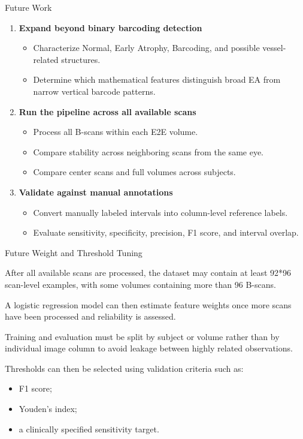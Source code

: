 \documentclass[aspectratio=169]{beamer}
\begin{document}
\begin{frame}{Future Work}

\begin{enumerate}
    \item \textbf{Expand beyond binary barcoding detection}
    \begin{itemize}
        \item Characterize Normal, Early Atrophy, Barcoding, and possible
        vessel-related structures.
        \item Determine which mathematical features distinguish broad EA from
        narrow vertical barcode patterns.
    \end{itemize}

    \item \textbf{Run the pipeline across all available scans}
    \begin{itemize}
        \item Process all B-scans within each E2E volume.
        \item Compare stability across neighboring scans from the same eye.
        \item Compare center scans and full volumes across subjects.
    \end{itemize}

    \item \textbf{Validate against manual annotations}
    \begin{itemize}
        \item Convert manually labeled intervals into column-level reference
        labels.
        \item Evaluate sensitivity, specificity, precision, F1 score, and
        interval overlap.
    \end{itemize}
\end{enumerate}

\end{frame}

\begin{frame}{Future Weight and Threshold Tuning}

After all available scans are processed, the dataset may contain at least 92*96
scan-level examples, with some volumes containing more than 96 B-scans.

\vspace{0.3cm}

A logistic regression model can then estimate feature weights once more scans have been processed and reliability is assessed.

Training and evaluation must be split by subject or volume rather than by
individual image column to avoid leakage between highly related observations.

Thresholds can then be selected using validation criteria such as:

\begin{itemize}
    \item F1 score;
    \item Youden's index;
    \item a clinically specified sensitivity target.
\end{itemize}

\end{frame}
\end{document}
